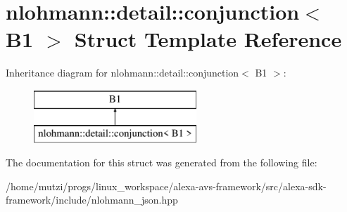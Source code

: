 \hypertarget{structnlohmann_1_1detail_1_1conjunction_3_01B1_01_4}{}\section{nlohmann\+:\+:detail\+:\+:conjunction$<$ B1 $>$ Struct Template Reference}
\label{structnlohmann_1_1detail_1_1conjunction_3_01B1_01_4}
Inheritance diagram for nlohmann\+:\+:detail\+:\+:conjunction$<$ B1 $>$\+:\begin{figure}[H]
\begin{center}
\leavevmode
\includegraphics[height=2.000000cm]{d1/d96/structnlohmann_1_1detail_1_1conjunction_3_01B1_01_4}
\end{center}
\end{figure}


The documentation for this struct was generated from the following file\+:\begin{DoxyCompactItemize}
\item 
/home/mutzi/progs/linux\+\_\+workspace/alexa-\/avs-\/framework/src/alexa-\/sdk-\/framework/include/nlohmann\+\_\+json.\+hpp\end{DoxyCompactItemize}
